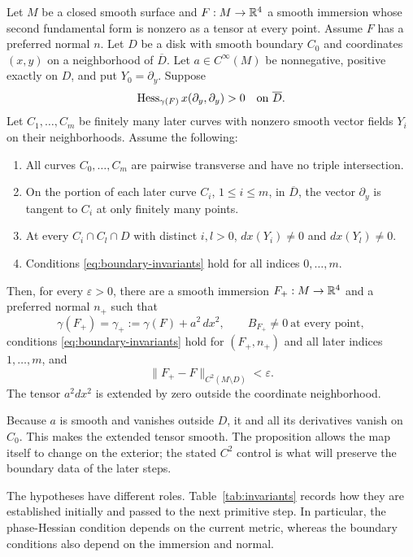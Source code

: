 \begin{proposition}
\label{prop:primitive-addition}
Let $M$ be a closed smooth surface and $F:M\to\mathbb{R}^4$ a smooth immersion
whose second fundamental form is nonzero as a tensor at every point.
Assume $F$ has a preferred normal $n$.  Let $D$ be a disk with smooth
boundary $C_0$ and coordinates $(x,y)$ on a neighborhood of $\overline D$.
Let $a\in C^\infty(M)$ be nonnegative, positive exactly on $D$, and put
$Y_0=\partial_y$.  Suppose
\begin{equation}
 \operatorname{Hess}_{\gamma(F)}x(\partial_y,\partial_y)>0
 \quad\text{on }\overline D.
 \label{eq:primitive-hessian}
\end{equation}
Let $C_1,\ldots,C_m$ be finitely many later curves with nonzero smooth
vector fields $Y_i$ on their neighborhoods.  Assume the following:
\begin{enumerate}
\item All curves $C_0,\ldots,C_m$ are pairwise transverse and have no
triple intersection.
\item On the portion of each later curve $C_i$, $1\le i\le m$, in $\overline D$, the vector
$\partial_y$ is tangent to $C_i$ at only finitely many points.
\item At every $C_i\cap C_l\cap D$ with distinct $i,l>0$,
$dx(Y_i)\ne0$ and $dx(Y_l)\ne0$.
\item Conditions \eqref{eq:boundary-invariants} hold for all indices
$0,\ldots,m$.
\end{enumerate}
Then, for every $\varepsilon>0$, there are a smooth immersion
$F_+:M\to\mathbb{R}^4$ and a preferred normal $n_+$ such that
\[
 \gamma(F_+)=\gamma_+:=\gamma(F)+a^2\,dx^2,
 \qquad B_{F_+}\ne0\ \text{at every point},
\]
conditions \eqref{eq:boundary-invariants} hold for $(F_+,n_+)$ and all
later indices $1,\ldots,m$, and
\[
 \|F_+-F\|_{C^2(M\setminus D)}<\varepsilon.
\]
The tensor $a^2dx^2$ is extended by zero outside the coordinate neighborhood.
\end{proposition}

Because $a$ is smooth and vanishes outside $D$, it and all its derivatives
vanish on $C_0$.  This makes the extended tensor smooth.  The proposition
allows the map itself to change on the exterior; the stated $C^2$ control
is what will preserve the boundary data of the later steps.

The hypotheses have different roles.  Table~\ref{tab:invariants} records
how they are established initially and passed to the next primitive step.
In particular, the phase-Hessian condition depends on the current metric,
whereas the boundary conditions also depend on the immersion and normal.

